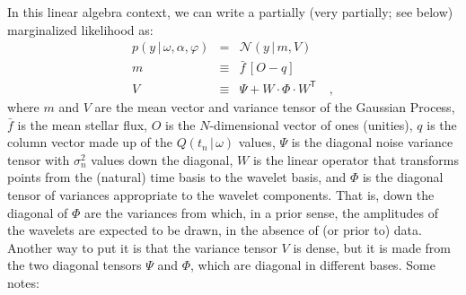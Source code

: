 \documentclass[12pt,letterpaper]{article}
\newcommand{\given}{\,|\,}
\newcommand{\transpose}[1]{{#1}^{\mathsf{T}}}
\newcommand{\datavec}{y}
\newcommand{\exofn}{Q}
\newcommand{\exovec}{q}
\newcommand{\exopars}{\omega}
\newcommand{\meanflux}{\bar{f}}
\newcommand{\starpars}{\alpha}
\newcommand{\variance}{\sigma^2}
\newcommand{\hyperpars}{\varphi}
\newcommand{\normal}{{\mathcal N}}
\newcommand{\meanvec}{m}
\newcommand{\noisetensor}{\Psi}
\newcommand{\wavetensor}{\Phi}
\newcommand{\weightmatrix}{W}
\newcommand{\vartensor}{V}
\newcommand{\onevec}{O}
\begin{document}
In this linear algebra context,
we can write a partially (very partially; see below) marginalized likelihood as:
\begin{eqnarray}
p(\datavec\given\exopars,\starpars,\hyperpars)
  &=& \normal(\datavec\given\meanvec,\vartensor)
\label{eq:wavelike}
\\
\meanvec
  &\equiv& \meanflux\,[\onevec - \exovec]
\\
\vartensor
  &\equiv& \noisetensor + \weightmatrix\cdot\wavetensor\cdot\transpose{\weightmatrix}
\label{eq:variance}
\quad ,
\end{eqnarray}
where
$\meanvec$ and $\vartensor$ are the mean vector and variance tensor of the Gaussian Process,
$\meanflux$ is the mean stellar flux,
$\onevec$ is the $N$-dimensional vector of ones (unities),
$\exovec$ is the column vector made up of the $\exofn(t_n\given\exopars)$ values,
$\noisetensor$ is the diagonal noise variance tensor with $\variance_n$ values down the diagonal,
$\weightmatrix$ is the linear operator that transforms points
from the (natural) time basis to the wavelet basis,
and $\wavetensor$ is the diagonal tensor of variances appropriate to the wavelet components.
That is, down the diagonal of $\wavetensor$ are the variances from which,
in a prior sense,
the amplitudes of the wavelets are expected to be drawn,
in the absence of (or prior to) data.
Another way to put it is that the variance tensor $\vartensor$ is dense,
but it is made from the two diagonal tensors $\noisetensor$ and $\wavetensor$,
which are diagonal in different bases.  Some notes:
\end{document}
